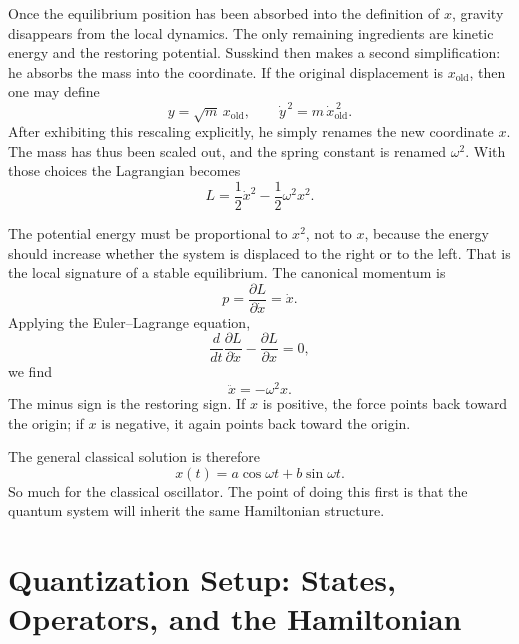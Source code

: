 Once the equilibrium position has been absorbed into the definition of \(x\), gravity disappears from the local dynamics. The only remaining ingredients are kinetic energy and the restoring potential. Susskind then makes a second simplification: he absorbs the mass into the coordinate. If the original displacement is \(x_{\mathrm{old}}\), then one may define
\begin{equation}
y=\sqrt{m}\,x_{\mathrm{old}},
\qquad
\dot y^{\,2}=m\,\dot x_{\mathrm{old}}^{\,2}.
\end{equation}
After exhibiting this rescaling explicitly, he simply renames the new coordinate \(x\). The mass has thus been scaled out, and the spring constant is renamed \(\omega^{2}\). With those choices the Lagrangian becomes
\begin{equation}
L=\frac{1}{2}\dot x^{2}-\frac{1}{2}\omega^{2}x^{2}.
\label{eq:ho_lagrangian}
\end{equation}

The potential energy must be proportional to \(x^{2}\), not to \(x\), because the energy should increase whether the system is displaced to the right or to the left. That is the local signature of a stable equilibrium. The canonical momentum is
\begin{equation}
p=\frac{\partial L}{\partial \dot x}=\dot x.
\end{equation}
Applying the Euler--Lagrange equation,
\begin{equation}
\frac{d}{dt}\frac{\partial L}{\partial \dot x}-\frac{\partial L}{\partial x}=0,
\end{equation}
we find
\begin{equation}
\ddot x=-\omega^{2}x.
\label{eq:ho_classical_eom}
\end{equation}
The minus sign is the restoring sign. If \(x\) is positive, the force points back toward the origin; if \(x\) is negative, it again points back toward the origin.

The general classical solution is therefore
\begin{equation}
x(t)=a\cos\omega t+b\sin\omega t.
\end{equation}
So much for the classical oscillator. The point of doing this first is that the quantum system will inherit the same Hamiltonian structure.

\section{Quantization Setup: States, Operators, and the Hamiltonian}

